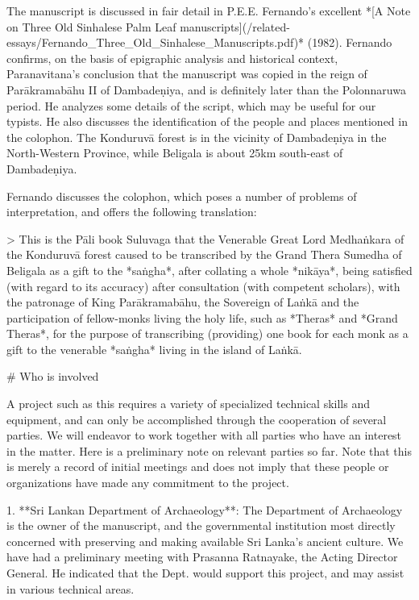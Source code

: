 \documentclass[11pt, openany,a5paper]{article}
\begin{document}
\begin{markdown}
The manuscript is discussed in fair detail in P.E.E. Fernando’s excellent *[A Note on Three Old Sinhalese Palm Leaf manuscripts](/related-essays/Fernando_Three_Old_Sinhalese_Manuscripts.pdf)* (1982). Fernando confirms, on the basis of epigraphic analysis and historical context, Paranavitana’s conclusion that the manuscript was copied in the reign of Parākramabāhu II of Dambadeṇiya, and is definitely later than the Polonnaruwa period. He analyzes some details of the script, which may be useful for our typists. He also discusses the identification of the people and places mentioned in the colophon. The Konduruvā forest is in the vicinity of Dambadeṇiya in the North-Western Province, while Beligala is about 25km south-east of Dambadeṇiya.

Fernando discusses the colophon, which poses a number of problems of interpretation, and offers the following translation:

> This is the Pāli book Suluvaga that the Venerable Great Lord Medhaṅkara of the Konduruvā forest caused to be transcribed by the Grand Thera Sumedha of Beligala as a gift to the *saṅgha*, after collating a whole *nikāya*, being satisfied (with regard to its accuracy) after consultation (with competent scholars), with the patronage of King Parākramabāhu, the Sovereign of Laṅkā and the participation of fellow-monks living the holy life, such as *Theras* and *Grand Theras*, for the purpose of transcribing (providing) one book for each monk as a gift to the venerable *saṅgha* living in the island of Laṅkā.

# Who is involved

A project such as this requires a variety of specialized technical skills and equipment, and can only be accomplished through the cooperation of several parties. We will endeavor to work together with all parties who have an interest in the matter. Here is a preliminary note on relevant parties so far. Note that this is merely a record of initial meetings and does not imply that these people or organizations have made any commitment to the project.

1. **Sri Lankan Department of Archaeology**: The Department of Archaeology is the owner of the manuscript, and the governmental institution most directly concerned with preserving and making available Sri Lanka’s ancient culture. We have had a preliminary meeting with Prasanna Ratnayake, the Acting Director General. He indicated that the Dept. would support this project, and may assist in various technical areas.


\end{markdown}
\end{document}
